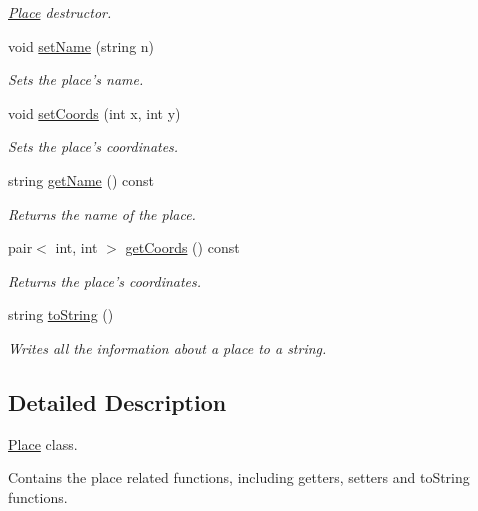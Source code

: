 \begin{DoxyCompactItemize}
\begin{DoxyCompactList}\small\item\em \hyperlink{class_place}{Place} destructor. \end{DoxyCompactList}\item 
void \hyperlink{class_place_a6dcfdcda0a20a4d747b9b5657fc0e627}{set\+Name} (string n)
\begin{DoxyCompactList}\small\item\em Sets the place's name. \end{DoxyCompactList}\item 
void \hyperlink{class_place_ad5b15f3ca8aef6b51e0b6958ba40e106}{set\+Coords} (int x, int y)
\begin{DoxyCompactList}\small\item\em Sets the place's coordinates. \end{DoxyCompactList}\item 
string \hyperlink{class_place_a9353ceaa630511ca25a133cc545f6b93}{get\+Name} () const 
\begin{DoxyCompactList}\small\item\em Returns the name of the place. \end{DoxyCompactList}\item 
pair$<$ int, int $>$ \hyperlink{class_place_adf486c33d5463f1b0000a286cc171beb}{get\+Coords} () const 
\begin{DoxyCompactList}\small\item\em Returns the place's coordinates. \end{DoxyCompactList}\item 
string \hyperlink{class_place_af3d96742c03650c51726c5dde5ba0dd5}{to\+String} ()
\begin{DoxyCompactList}\small\item\em Writes all the information about a place to a string. \end{DoxyCompactList}\end{DoxyCompactItemize}


\subsection{Detailed Description}
\hyperlink{class_place}{Place} class. 

Contains the place related functions, including getters, setters and to\+String functions. 

